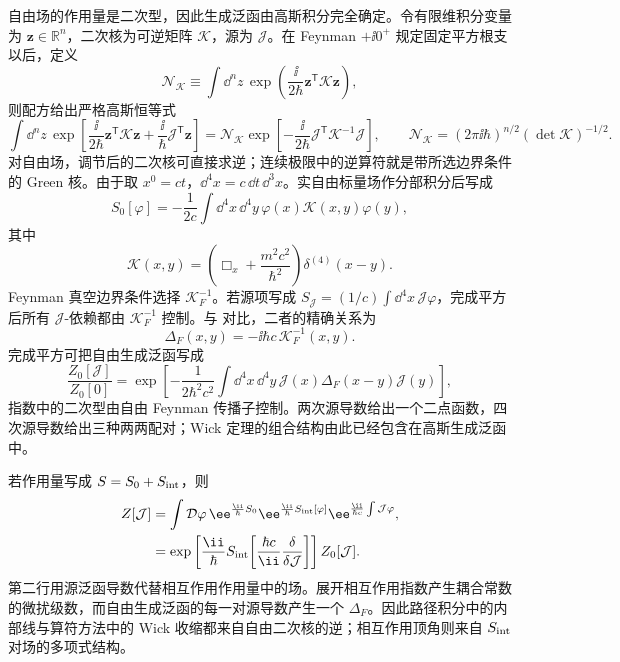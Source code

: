 自由场的作用量是二次型，因此生成泛函由高斯积分完全确定。令有限维积分变量为 $\mathbf z\in\mathbb R^n$，二次核为可逆矩阵 $\mathcal K$，源为 $\mathcal J$。在 Feynman $+\ii0^+$ 规定固定平方根支以后，定义
\begin{equation*}
 \mathcal N_{\mathcal K}
 \equiv
 \int\dd^nz\,
 \exp\!\left(\frac{\ii}{2\hbar}\mathbf z^{\mathsf T}\mathcal K\mathbf z\right),
\end{equation*}
则配方给出严格高斯恒等式
\begin{equation}
 \int\dd^nz\,
 \exp\left[\frac{\ii}{2\hbar}\mathbf z^{\mathsf T}\mathcal K\mathbf z+\frac{\ii}{\hbar}\mathcal J^{\mathsf T}\mathbf z\right]
 =
 \mathcal N_{\mathcal K}
 \exp\left[-\frac{\ii}{2\hbar}\mathcal J^{\mathsf T}\mathcal K^{-1}\mathcal J\right],
 \qquad
 \mathcal N_{\mathcal K}=(2\pi\ii\hbar)^{n/2}(\det\mathcal K)^{-1/2}.
 \label{eq:gaussian-finite-r2}
\end{equation}
对自由场，调节后的二次核可直接求逆；连续极限中的逆算符就是带所选边界条件的 Green 核。由于取 $x^0=ct$，$\dd^4 x=c\,\dd t\,\dd^3 x$。实自由标量场作分部积分后写成
\begin{equation*}
 S_0[\varphi]
 =-\frac1{2c}\int\dd^4 x\,\dd^4 y\,
 \varphi(x)\mathcal K(x,y)\varphi(y),
\end{equation*}
其中
\begin{equation*}
 \mathcal K(x,y)
 =\left(\Box_x+\frac{m^2c^2}{\hbar^2}\right)
 \delta^{(4)}(x-y).
\end{equation*}
Feynman 真空边界条件选择 $\mathcal K_F^{-1}$。若源项写成
$S_\mathcal J=(1/c)\int\dd^4 x\,\mathcal J\varphi$，完成平方后所有 $\mathcal J$-依赖都由 $\mathcal K_F^{-1}$ 控制。与  对比，二者的精确关系为
\begin{equation}
 \boxed{
 \Delta_F(x,y)=-\ii\hbar c\,\mathcal K_F^{-1}(x,y).}
 \label{eq:scalar-kernel-inverse-r2}
\end{equation}
完成平方可把自由生成泛函写成
\begin{equation}
 \boxed{
 \frac{Z_0[\mathcal J]}{Z_0[0]}
 =\exp\left[
 -\frac{1}{2\hbar^2c^2}
 \int\dd^4 x\,\dd^4 y\,
 \mathcal J(x)\Delta_F(x-y)\mathcal J(y)
 \right],}
 \label{eq:free-generating-functional-r3}
\end{equation}
指数中的二次型由自由 Feynman 传播子控制。两次源导数给出一个二点函数，四次源导数给出三种两两配对；Wick 定理的组合结构由此已经包含在高斯生成泛函中。

若作用量写成 $S=S_0+S_{\rm int}$，则
\begin{align}
 Z[\mathcal J]
 &=\int\mathcal D\varphi\,
 \ee^{\frac{\ii}{\hbar}S_0}
 \ee^{\frac{\ii}{\hbar}S_{\rm int}[\varphi]}
 \ee^{\frac{\ii}{\hbar c}\int \mathcal J\varphi},\\
 &=\exp\left[
 \frac{\ii}{\hbar}S_{\rm int}\!\left[
 \frac{\hbar c}{\ii}\frac{\delta}{\delta \mathcal J}
 \right]\right] Z_0[\mathcal J].
 \label{eq:interacting-Z-from-free-r3}
\end{align}
第二行用源泛函导数代替相互作用作用量中的场。展开相互作用指数产生耦合常数的微扰级数，而自由生成泛函的每一对源导数产生一个 $\Delta_F$。因此路径积分中的内部线与算符方法中的 Wick 收缩都来自自由二次核的逆；相互作用顶角则来自 $S_{\rm int}$ 对场的多项式结构。

